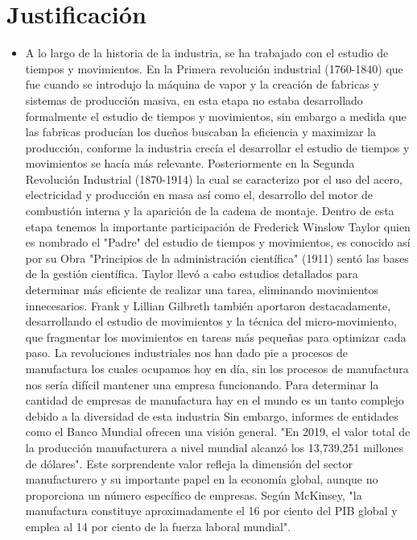     \section{Justificación}
    
    \begin{itemize}
        \item A lo largo de la historia de la industria, se ha trabajado con el estudio de tiempos y movimientos.
        En la Primera revolución industrial (1760-1840) que fue cuando se introdujo la máquina de vapor y la creación de fabricas y sistemas de producción masiva, en esta etapa no estaba desarrollado formalmente el estudio de tiempos y movimientos, sin embargo a medida que las fabricas producían los dueños buscaban la eficiencia y maximizar la producción, conforme la industria crecía el desarrollar el estudio de tiempos y movimientos se hacía más relevante.
        Posteriormente en la Segunda Revolución Industrial (1870-1914) \cite{RevoluciónIndustrial} la cual se caracterizo por el uso del acero, electricidad y producción en masa así como el, desarrollo del motor de combustión interna y la aparición de la cadena de montaje. Dentro de esta etapa tenemos la importante participación de Frederick Winslow Taylor quien es nombrado el "Padre" del estudio de tiempos y movimientos, es conocido así por su Obra "Principios de la administración científica" (1911) sentó las bases de la gestión científica. Taylor llevó a cabo estudios detallados para determinar más eficiente de realizar una tarea, eliminando movimientos innecesarios\cite{Taylor}. Frank y Lillian Gilbreth también aportaron destacadamente, desarrollando el estudio de movimientos y la técnica del micro-movimiento, que fragmentar los movimientos en tareas más pequeñas para optimizar cada paso.\cite{Gilberth}
       La revoluciones industriales nos han dado pie a procesos de manufactura los cuales ocupamos hoy en día, sin los procesos de manufactura nos sería difícil mantener una empresa funcionando.
       Para determinar la cantidad de empresas de manufactura hay en el mundo es un tanto complejo debido a la diversidad de esta industria Sin embargo, informes de entidades como el Banco Mundial ofrecen una visión general. "En 2019, el valor total de la producción manufacturera a nivel mundial alcanzó los 13,739,251 millones de dólares". Este sorprendente valor refleja la dimensión del sector manufacturero y su importante papel en la economía global, aunque no proporciona un número específico de empresas. Según McKinsey, "la manufactura constituye aproximadamente el 16 por ciento del PIB global y emplea al 14 por ciento de la fuerza laboral mundial". 

\end{itemize}
